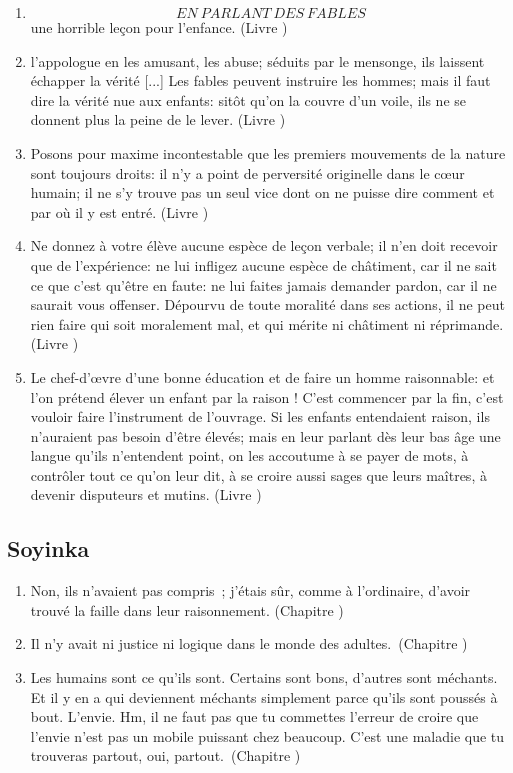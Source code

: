 \documentclass[a4paper, 11pt, hidelinks]{article}
\newcommand{\rb}[1]{\Romanbar{#1}}
\begin{document}
\begin{enumerate}
    \item \[ EN \ PARLANT \ DES \ FABLES\] une horrible leçon pour l'enfance. (Livre \rb{2})
    \item l'appologue en les amusant, les abuse; séduits par le mensonge, ils laissent échapper la vérité [...] Les fables peuvent instruire les hommes; mais il faut dire la vérité nue aux enfants: sitôt qu'on la couvre d'un voile, ils ne se donnent plus la peine de le lever. (Livre \rb{2})
    \item Posons pour maxime incontestable que les premiers mouvements de la nature sont toujours droits: il n'y a point de perversité originelle dans le c\oe ur humain; il ne s'y trouve pas un seul vice dont on ne puisse dire comment et par où il y est entré. (Livre \rb{2})
    \item Ne donnez à votre élève aucune espèce de leçon verbale; il n'en doit recevoir que de l'expérience: ne lui infligez aucune espèce de châtiment, car il ne sait ce que c'est qu'être en faute: ne lui faites jamais demander pardon, car il ne saurait vous offenser. Dépourvu de toute moralité dans ses actions, il ne peut rien faire qui soit moralement mal, et qui mérite ni châtiment ni réprimande. (Livre \rb{2})
    \item Le chef-d'\oe vre d'une bonne éducation et de faire un homme raisonnable: et l'on prétend élever un enfant par la raison ! C'est commencer par la fin, c'est vouloir faire l'instrument de l'ouvrage. Si les enfants entendaient raison, ils n'auraient pas besoin d'être élevés; mais en leur parlant dès leur bas âge une langue qu'ils n'entendent point, on les accoutume à se payer de mots, à contrôler tout ce qu'on leur dit, à se croire aussi sages que leurs maîtres, à devenir disputeurs et mutins. (Livre \rb{2})
\end{enumerate}



\subsection{Soyinka}


\begin{enumerate}
    \item Non, ils n'avaient pas compris ; j'étais sûr, comme à l'ordinaire, d'avoir trouvé la faille dans leur raisonnement. (Chapitre \rb{4})
    \item Il n'y avait ni justice ni logique dans le monde des adultes. (Chapitre \rb{7})
    \item Les humains sont ce qu'ils sont. Certains sont bons, d'autres sont méchants. Et il y en a qui deviennent méchants simplement parce qu'ils sont poussés à bout. L'envie. Hm, il ne faut pas que tu commettes l'erreur de croire que l'envie n'est pas un mobile puissant chez beaucoup. C'est une maladie que tu trouveras partout, oui, partout. (Chapitre \rb{9})
\end{enumerate}
\end{document}

